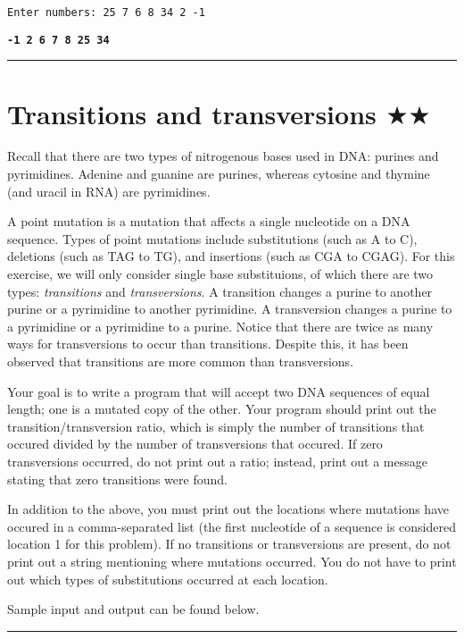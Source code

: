 \documentclass[12pt, letterpaper]{article}
\begin{document}
\texttt{Enter numbers: 25 7 6 8 34 2 -1}

\texttt{\bfseries -1 2 6 7 8 25 34}

\vspace{2mm}\hrule\vspace{2mm}

\section{\upshape Transitions and transversions $\bigstar\bigstar$}
Recall that there are two types of nitrogenous bases used in DNA: purines and pyrimidines. Adenine and guanine are purines, whereas cytosine and thymine (and uracil in RNA) are pyrimidines.

A point mutation is a mutation that affects a single nucleotide on a DNA sequence. Types of point mutations include substitutions (such as A to C), deletions (such as TAG to TG), and insertions (such as CGA to CGAG). For this exercise, we will only consider single base substituions, of which there are two types: \emph{transitions} and \emph{transversions}. A transition changes a purine to another purine or a pyrimidine to another pyrimidine. A transversion changes a purine to a pyrimidine or a pyrimidine to a purine. Notice that there are twice as many ways for transversions to occur than transitions. Despite this, it has been observed that transitions are more common than transversions.

Your goal is to write a program that will accept two DNA sequences of equal length; one is a mutated copy of the other. Your program should print out the transition/transversion ratio, which is simply the number of transitions that occured divided by the number of transversions that occured. If zero transversions occurred, do not print out a ratio; instead, print out a message stating that zero transitions were found.

In addition to the above, you must print out the locations where mutations have occured in a comma-separated list (the first nucleotide of a sequence is considered location 1 for this problem). If no transitions or transversions are present, do not print out a string mentioning where mutations occurred. You do not have to print out which types of substitutions occurred at each location.

Sample input and output can be found below.

\vspace{2mm}\hrule\vspace{2mm}
\end{document}
